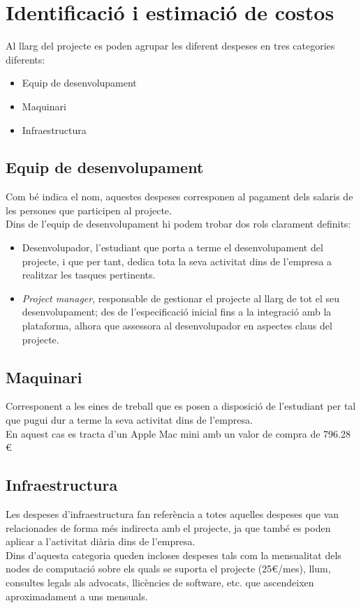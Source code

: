 \section{Identificació i estimació de costos}
Al llarg del projecte es poden agrupar les diferent despeses en tres categories diferents:
\begin{itemize}
	\item Equip de desenvolupament
	\item Maquinari
	\item Infraestructura
\end{itemize}

\subsection{Equip de desenvolupament}
Com bé indica el nom, aquestes despeses corresponen al pagament dels salaris de les persones que participen al projecte.\\
Dins de l'equip de desenvolupament hi podem trobar dos rols clarament definits:
\begin{itemize}
	\item Desenvolupador, l'estudiant que porta a terme el desenvolupament del projecte, i que per tant, dedica tota la seva activitat dins de l'empresa a realitzar les tasques pertinents.
	\item \textit{Project manager}, responsable de gestionar el projecte al llarg de tot el seu desenvolupament; des de l'especificació inicial fins a la integració amb la plataforma, alhora que assessora al desenvolupador en aspectes claus del projecte. 
\end{itemize}

\subsection{Maquinari}
Corresponent a les eines de treball que es posen a disposició de l'estudiant per tal que pugui dur a terme la seva activitat dins de l'empresa. \\
En aquest cas es tracta d'un Apple Mac mini amb un valor de compra de 796.28 \euro

\subsection{Infraestructura}
Les despeses d'infraestructura fan referència a totes aquelles despeses que van relacionades de forma més indirecta amb el projecte, ja que també es poden aplicar a l'activitat diària dins de l'empresa.\\
\newline Dins d'aquesta categoria queden incloses despeses tals com la mensualitat dels nodes de computació sobre els quals se suporta el projecte (25\euro/mes), llum, consultes legals als advocats, llicències de software, etc. que ascendeixen aproximadament a uns  mensuals.


